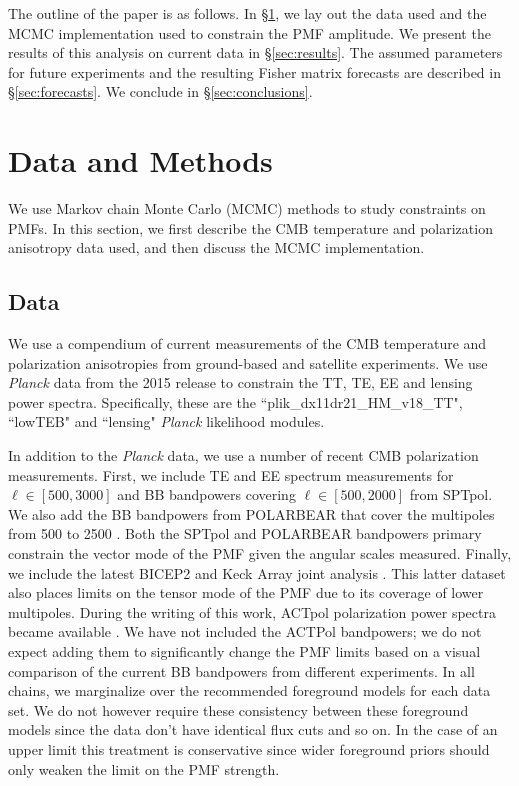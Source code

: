 \documentclass[preprint]{emulateapj}
\newcommand{\planck}{{\sl Planck}}
\newcommand{\pb}{POLARBEAR}
\newcommand{\sptpol}{SPTpol}
\begin{document}
The outline of the paper is as follows. 
In \S\ref{sec:data}, we lay out the data used and the MCMC implementation used to constrain the PMF amplitude. 
We present the results of this analysis on current data in \S\ref{sec:results}. 
The assumed parameters for future experiments and the resulting Fisher matrix forecasts are described in \S\ref{sec:forecasts}. 
We conclude in \S\ref{sec:conclusions}. 

\section{Data and Methods}
\label{sec:data}

We use  Markov chain Monte Carlo (MCMC) methods to study constraints on PMFs. 
In this section, we first describe the CMB temperature and polarization anisotropy data used, and then discuss the MCMC implementation. 




\subsection{Data}

We use a compendium of current measurements of the CMB temperature and polarization anisotropies from ground-based and satellite experiments. 
We use \planck{} data from the 2015 release to constrain the TT, TE, EE and lensing power spectra. 
Specifically, these are the ``plik\_dx11dr21\_HM\_v18\_TT", ``lowTEB" and ``lensing" \planck{} likelihood modules. 


In addition to the \planck{} data, we use a number of recent CMB polarization measurements. 
First, we include TE and EE spectrum measurements\citep{crites15} for $\ell \in [500,3000]$ and BB bandpowers covering $\ell \in [500,2000]$ \citep{keisler15} from SPTpol. 
We also add the BB bandpowers from \pb{} that cover the multipoles from 500 to 2500 \citep{polarbear14b}. 
Both the \sptpol{} and \pb{} bandpowers primary constrain the vector mode of the PMF given the angular scales measured. 
Finally, we include the latest BICEP2 and Keck Array  joint analysis \citep{bicepkeck15}. 
This latter dataset also places limits on the tensor mode of the PMF due to its coverage of lower multipoles. 
During the writing of this work, ACTpol polarization power spectra became available \citep{actpol}. 
We have not included the ACTPol bandpowers; we do not expect adding them to significantly change the PMF limits based on a visual comparison of the current BB bandpowers from different experiments.
In all chains, we marginalize over the recommended foreground models for each data set. 
We do not however require these consistency between these foreground models since the data don't have identical flux cuts and so on. 
In the case of an upper limit this treatment is conservative since wider foreground priors should only weaken the limit on the PMF strength. 
\end{document}
